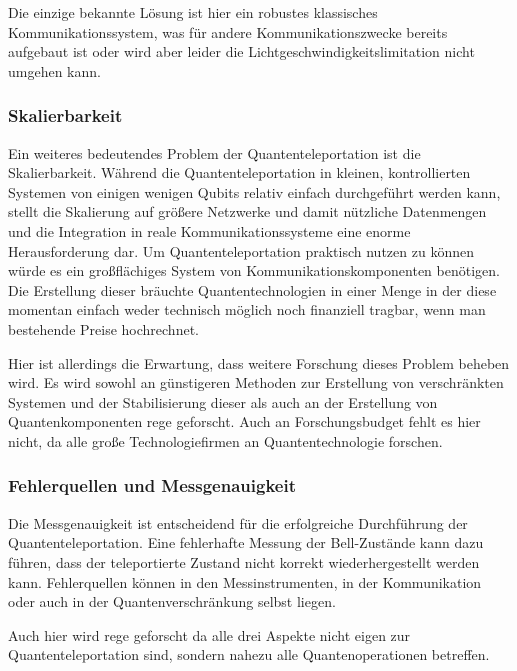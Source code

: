 Die einzige bekannte Lösung ist hier ein robustes klassisches Kommunikationssystem, was für andere Kommunikationszwecke
bereits aufgebaut ist oder wird aber leider die Lichtgeschwindigkeitslimitation nicht umgehen kann.


\subsubsection{Skalierbarkeit}

Ein weiteres bedeutendes Problem der Quantenteleportation ist die Skalierbarkeit.
Während die Quantenteleportation in kleinen, kontrollierten Systemen von einigen wenigen Qubits relativ einfach durchgeführt werden kann,
stellt die Skalierung auf größere Netzwerke und damit nützliche Datenmengen und die Integration in reale Kommunikationssysteme eine enorme Herausforderung dar.
Um Quantenteleportation praktisch nutzen zu können würde es ein großflächiges System von Kommunikationskomponenten
benötigen.
Die Erstellung dieser bräuchte Quantentechnologien in einer Menge in der diese momentan einfach weder technisch möglich
noch finanziell tragbar, wenn man bestehende Preise hochrechnet.

Hier ist allerdings die Erwartung, dass weitere Forschung dieses Problem beheben wird.
Es wird sowohl an günstigeren Methoden zur Erstellung von verschränkten Systemen und der Stabilisierung dieser
als auch an der Erstellung von Quantenkomponenten rege geforscht.
Auch an Forschungsbudget fehlt es hier nicht, da alle große Technologiefirmen an Quantentechnologie forschen.

\subsubsection{Fehlerquellen und Messgenauigkeit}
Die Messgenauigkeit ist entscheidend für die erfolgreiche Durchführung der Quantenteleportation.
Eine fehlerhafte Messung der Bell-Zustände kann dazu führen, dass der teleportierte Zustand nicht korrekt wiederhergestellt werden kann.
Fehlerquellen können in den Messinstrumenten, in der Kommunikation oder auch in der Quantenverschränkung selbst liegen.

Auch hier wird rege geforscht da alle drei Aspekte nicht eigen zur Quantenteleportation sind, sondern nahezu alle
Quantenoperationen betreffen.



